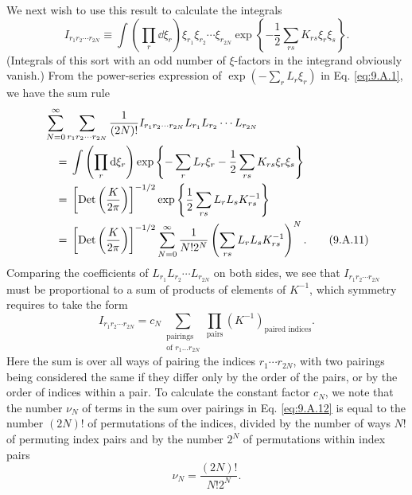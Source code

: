 We next wish to use this result to calculate the integrals
\begin{equation}
  I_{r_1r_2\cdots r_{2N}}\equiv
  \int\left(\prod_r \dd\xi_r\right)\xi_{r_1}\xi_{r_2}\cdots\xi_{r_{2N}}
  \exp\left\{-\frac{1}{2}\sum_{rs}K_{rs}\xi_r\xi_s\right\}.
  \tag{9.A.10}\label{eq:9.A.10}
\end{equation}
(Integrals of this sort with an odd number of $\xi$-factors in the integrand
obviously vanish.) From the power-series expression of
$\exp(-\sum_rL_r\xi_r)$ in Eq. \eqref{eq:9.A.1}, we have the sum rule
\begin{align}
  &\sum_{N=0}^{\infty}\sum_{r_1r_2\cdots r_{2N}}
  \frac{1}{(2N)!}I_{r_1r_2\cdots r_{2N}}
  L_{r_1}L_{r_2}\cdots L_{r_{2N}}
  \notag\\
  &\quad={}
  \int\left(\prod_r \mathop{}\!\mathrm{d}\xi_r\right)
  \exp\left\{-\sum_rL_r\xi_r-\frac{1}{2}\sum_{rs}K_{rs}\xi_r\xi_s\right\}
  \notag\\
  &\quad={}
  \left[\operatorname{Det}\left(\frac{K}{2\pi}\right)\right]^{-1/2}
  \exp\left\{\frac{1}{2}\sum_{rs}L_rL_sK^{-1}_{rs}\right\}
  \notag\\
  &\quad={}
  \left[\operatorname{Det}\left(\frac{K}{2\pi}\right)\right]^{-1/2}
  \sum_{N=0}^{\infty}\frac{1}{N!2^N}
  \left(\sum_{rs}L_rL_sK^{-1}_{rs}\right)^N.
  \tag{9.A.11}\label{eq:9.A.11}
\end{align}
Comparing the coefficients of $L_{r_1}L_{r_2}\cdots L_{r_{2N}}$ on both
sides, we see that $I_{r_1r_2\cdots r_{2N}}$ must be proportional to a sum
of products of elements of $K^{-1}$, which symmetry requires to take the
form
\begin{equation}
  I_{r_1r_2\cdots r_{2N}}
  =c_N\sum_{\substack{\text{pairings}\\\text{of }r_1\ldots r_{2N}}}
  \prod_{\text{pairs}}(K^{-1})_{\text{paired indices}}.
  \tag{9.A.12}\label{eq:9.A.12}
\end{equation}
Here the sum is over all ways of pairing the indices $r_1\cdots r_{2N}$,
with two pairings being considered the same if they differ only by the order
of the pairs, or by the order of indices within a pair. To calculate the
constant factor $c_N$, we note that the number $\nu_N$ of terms in the sum
over pairings in Eq. \eqref{eq:9.A.12} is equal to the number $(2N)!$ of permutations
of the indices, divided by the number of ways $N!$ of permuting index pairs
and by the number $2^N$ of permutations within index pairs
\begin{equation}
  \nu_N=\frac{(2N)!}{N!2^N}.
  \tag{9.A.13}\label{eq:9.A.13}
\end{equation}
